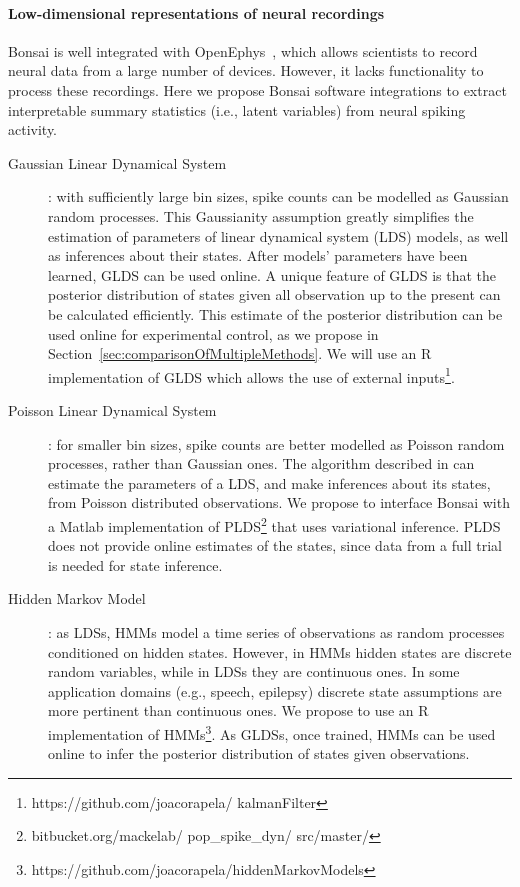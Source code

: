 \paragraph{Low-dimensional representations of neural recordings}
\label{sec:lowDimensionalRepresentation}

Bonsai is well integrated with OpenEphys~\citep{siegleEtAl17}, which allows
scientists to record neural data from a large number of devices. However, it
lacks functionality to process these recordings. Here we propose Bonsai software integrations to extract interpretable summary statistics
(i.e., latent variables) from neural spiking activity.

\begin{description}

    \item[Gaussian Linear Dynamical
        System]\citep[(GLDS)][]{andersonAndMoore12}: with sufficiently large
        bin sizes, spike counts can be modelled as Gaussian random processes.
        This Gaussianity assumption greatly simplifies the estimation of
        parameters of linear dynamical system (LDS) models, as well as
        inferences about their states. After models' parameters have been
        learned, GLDS can be used online. A unique feature of GLDS is that the
        posterior distribution of states given all observation up to the
        present can be calculated efficiently. This estimate of the posterior
        distribution can be used online for experimental control, as we
        propose in Section~\ref{sec:comparisonOfMultipleMethods}. We will use an R implementation of GLDS
        which allows the use of external
        inputs\footnote{https://github.com/joacorapela/ kalmanFilter}.

    \item[Poisson Linear Dynamical System]\citep[PLDS][]{mackeEtAl15}: for
        smaller bin sizes, spike counts are better modelled as Poisson random
        processes, rather than Gaussian ones. The algorithm described in
        \citet{mackeEtAl15} can estimate the parameters of a LDS, and make
        inferences about its states, from Poisson distributed observations.  We
        propose to interface Bonsai with a Matlab implementation of
        PLDS\footnote{bitbucket.org/mackelab/ pop\_spike\_dyn/ src/master/}
        that uses variational inference. PLDS does not provide online estimates
        of the states, since data from a full trial is needed for state
        inference.

    \item[Hidden Markov Model]\citep[HMM;][]{rabiner89}: as LDSs, HMMs model a
        time series of observations as random processes conditioned on hidden
        states. However, in HMMs hidden states are discrete random variables,
        while in LDSs they are continuous ones. In some application domains
        (e.g., speech, epilepsy) discrete state assumptions are more pertinent
        than continuous ones. We propose to use an R implementation of
        HMMs\footnote{https://github.com/joacorapela/hiddenMarkovModels}.
        As GLDSs, once trained, HMMs can be used online to infer the posterior
        distribution of states given observations.


\end{description}
